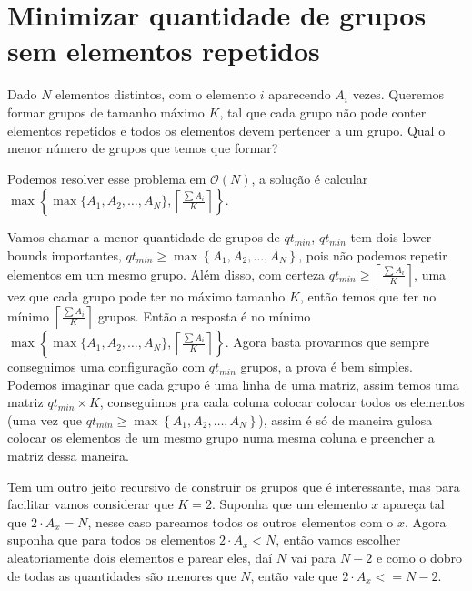 
\section{Minimizar quantidade de grupos sem elementos repetidos}
Dado $N$ elementos distintos, com o elemento $i$ aparecendo $A_i$ vezes. Queremos formar grupos de tamanho máximo $K$, tal que cada grupo não pode conter elementos repetidos e todos os elementos devem pertencer a um grupo. Qual o menor número de grupos que temos que formar?

Podemos resolver esse problema em $\mathcal{O}(N)$, a solução é calcular $\max\left\{\max\{A_1,A_2,\dots,A_N\}, \left\lceil \frac{\sum A_i}{K} \right\rceil  \right\}$.

Vamos chamar a menor quantidade de grupos de $qt_{min}$, $qt_{min}$ tem dois lower bounds importantes, $qt_{min} \ge \max\left\{ A_1,A_2,\dots,A_N \right\}$, pois não podemos repetir elementos em um mesmo grupo. Além disso, com certeza $qt_{min} \ge \left\lceil \frac{\sum A_i}{K} \right\rceil$, uma vez que cada grupo pode ter no máximo tamanho $K$, então temos que ter no mínimo $\left\lceil \frac{\sum A_i}{K} \right\rceil$ grupos. Então a resposta é no mínimo $\max\left\{\max\{A_1,A_2,\dots,A_N\}, \left\lceil \frac{\sum A_i}{K} \right\rceil  \right\}$. Agora basta provarmos que sempre conseguimos uma configuração com $qt_{min}$ grupos, a prova é bem simples. Podemos imaginar que cada grupo é uma linha de uma matriz, assim temos uma matriz $qt_{min} \times K$, conseguimos pra cada coluna colocar colocar todos os elementos (uma vez que $qt_{min} \ge \max\left\{ A_1,A_2,\dots,A_N \right\}$), assim é só de maneira gulosa colocar os elementos de um mesmo grupo numa mesma coluna e preencher a matriz dessa maneira.

Tem um outro jeito recursivo de construir os grupos que é interessante, mas para facilitar vamos considerar que $K = 2$. Suponha que um elemento $x$ apareça tal que $2 \cdot A_x = N$, nesse caso pareamos todos os outros elementos com o $x$.  Agora suponha que para todos os elementos $2 \cdot A_x < N$, então vamos escolher aleatoriamente dois elementos e parear eles, daí $N$ vai para $N-2$ e como o dobro de todas as quantidades são menores que $N$, então vale que $2 \cdot A_x <= N-2$.

